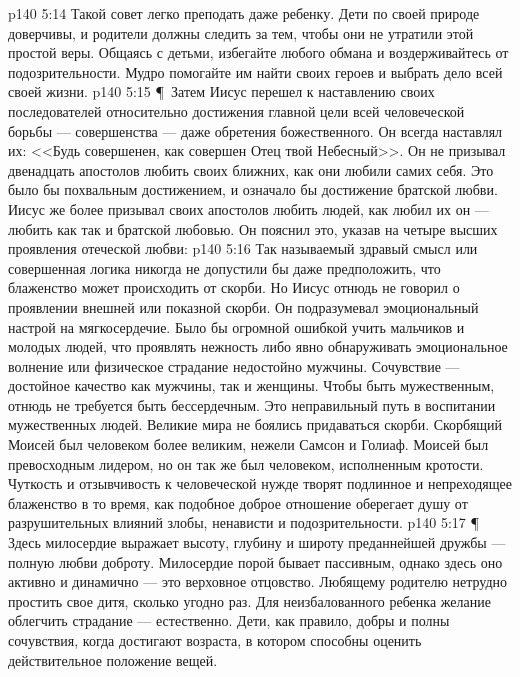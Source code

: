\vs p140 5:14 Такой совет легко преподать даже ребенку. Дети по своей природе доверчивы, и родители должны следить за тем, чтобы они не утратили этой простой веры. Общаясь с детьми, избегайте любого обмана и воздерживайтесь от подозрительности. Мудро помогайте им найти своих героев и выбрать дело всей своей жизни.
\vs p140 5:15 \P\ Затем Иисус перешел к наставлению своих последователей относительно достижения главной цели всей человеческой борьбы --- совершенства --- даже обретения божественного. Он всегда наставлял их: <<Будь совершенен, как совершен Отец твой Небесный>>. Он не призывал двенадцать апостолов любить своих ближних, как они любили самих себя. Это было бы похвальным достижением, и означало бы достижение братской любви. Иисус же более призывал своих апостолов любить людей, как любил их он --- любить как  так и братской любовью. Он пояснил это, указав на четыре высших проявления отеческой любви:
\vs p140 5:16 \bibnobreakspace {} Так называемый здравый смысл или совершенная логика никогда не допустили бы даже предположить, что блаженство может происходить от скорби. Но Иисус отнюдь не говорил о проявлении внешней или показной скорби. Он подразумевал эмоциональный настрой на мягкосердечие. Было бы огромной ошибкой учить мальчиков и молодых людей, что проявлять нежность либо явно обнаруживать эмоциональное волнение или физическое страдание недостойно мужчины. Сочувствие --- достойное качество как мужчины, так и женщины. Чтобы быть мужественным, отнюдь не требуется быть бессердечным. Это неправильный путь в воспитании мужественных людей. Великие мира не боялись придаваться скорби. Скорбящий Моисей был человеком более великим, нежели Самсон и Голиаф. Моисей был превосходным лидером, но он так же был человеком, исполненным кротости. Чуткость и отзывчивость к человеческой нужде творят подлинное и непреходящее блаженство в то время, как подобное доброе отношение оберегает душу от разрушительных влияний злобы, ненависти и подозрительности.
\vs p140 5:17 \P\ \bibnobreakspace {} Здесь милосердие выражает высоту, глубину и широту преданнейшей дружбы --- полную любви доброту. Милосердие порой бывает пассивным, однако здесь оно активно и динамично --- это верховное отцовство. Любящему родителю нетрудно простить свое дитя, сколько угодно раз. Для неизбалованного ребенка желание облегчить страдание --- естественно. Дети, как правило, добры и полны сочувствия, когда достигают возраста, в котором способны оценить действительное положение вещей.
